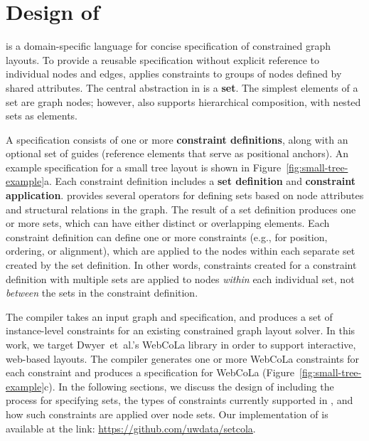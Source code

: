 \vspace{-1px}
\section{Design of \projectname}
\projectname is a domain-specific language for concise specification of 
constrained graph layouts. To provide a reusable specification 
without explicit reference to individual nodes and edges, \projectname
applies constraints to groups of nodes defined by shared attributes. 
The central abstraction in \projectname is a \textbf{set}. The 
simplest elements of a set are graph nodes; however, \projectname also
supports hierarchical composition, with nested sets as elements.

A \projectname specification consists of one or more \textbf{constraint definitions},
along with an optional set of guides (reference elements that serve as 
positional anchors). An example \projectname specification for a small tree 
layout is shown in Figure~\ref{fig:small-tree-example}a. Each constraint 
definition includes a \textbf{set definition} and \textbf{constraint application}.
\projectname provides several operators for defining
sets based on node attributes and structural relations in the graph.
The result of a set definition produces one or more sets, which 
can have either distinct or overlapping elements. Each constraint definition can 
define one or more constraints (e.g., for position, ordering, 
or alignment), which are applied to the nodes within each separate set created by the set definition. 
In other words, constraints created for a constraint definition with multiple sets are 
applied to nodes \emph{within} each individual set, not \emph{between} 
the sets in the constraint definition.

The \projectname compiler takes an input graph 
and specification, and produces a set of instance-level constraints for 
an existing constrained graph layout solver. In this work, we target 
Dwyer~et~al.'s WebCoLa library \cite{WebCoLa} in order to support
interactive, web-based layouts. The \projectname compiler generates one
or more WebCoLa constraints for each \projectname constraint and produces a
specification for WebCoLa (Figure~\ref{fig:small-tree-example}c).
 In the following sections, 
we discuss the design of \projectname including the process for 
specifying sets, the types of constraints currently supported in \projectname, 
and how such constraints are applied over node sets. 
Our implementation of \projectname is available at the link:
{\url{https://github.com/uwdata/setcola}}.

